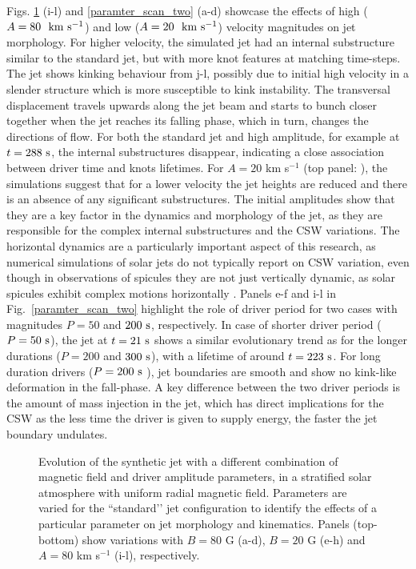 Figs. \ref{paramter_scan_one} (i-l) and \ref{paramter_scan_two} (a-d) showcase the effects of high ($A = 80 ~~\rm{km ~s^{-1}}$) and low ($A = 20 ~~\rm{km ~s^{-1}}$) velocity magnitudes on jet morphology. For higher velocity, the simulated jet had an internal substructure similar to the standard jet, but with more knot features at matching time-steps. The jet shows kinking behaviour from j-l, possibly due to initial high velocity in a slender structure which is more susceptible to kink instability. The transversal displacement travels upwards along the jet beam and starts to bunch closer together when the jet reaches its falling phase, which in turn, changes the directions of flow. For both the standard jet and high amplitude, for example at $t = 288 ~\rm{s}$, the internal substructures disappear, indicating a close association between driver time and knots lifetimes. For $A = 20$ km s$^{-1}$ (top panel: ), the simulations suggest that for a lower velocity the jet heights are reduced and there is an absence of any significant substructures. The initial amplitudes show that they are a key factor in the dynamics and morphology of the jet, as they are responsible for the complex internal substructures and the CSW variations. The horizontal dynamics are a particularly important aspect of this research, as numerical simulations of solar jets do not typically report on CSW variation, even though in observations of spicules they are not just vertically dynamic, as solar spicules exhibit complex motions horizontally \citep{Sharma2018ApJ85361S,Antolin2018ApJ85644A}. \np
%
Panels e-f and i-l in Fig.~\ref{paramter_scan_two} highlight the role of driver period for two cases with magnitudes $P = 50$ and $200~\rm{s}$, respectively. In case of shorter driver period ($P = 50 ~\rm{s}$), the jet at $t = 21~\rm{s}$ shows a similar evolutionary trend as for the longer durations ($P = 200$ and $300~\rm{s}$), with a lifetime of around $t = 223~\rm{s}$. For long duration drivers ($P = 200~\rm{s}$ ), jet boundaries are smooth and show no kink-like deformation in the fall-phase. A key difference between the two driver periods is the amount of mass injection in the jet, which has direct implications for the CSW as the less time the driver is given to supply energy, the faster the jet boundary undulates. \np
\begin{figure}
\captionsetup[subfigure]{labelformat=empty}
\centering
{}
\caption{Evolution of the synthetic jet with a different combination of magnetic field and driver amplitude parameters, in a stratified solar atmosphere with uniform radial magnetic field. Parameters are varied for the ``standard’’ jet configuration to identify the effects of a particular parameter on jet morphology and kinematics. Panels (top-bottom) show variations with $B = 80$ G (a-d), $B = 20$ G  (e-h) and $A = 80$ km s$^{-1}$ (i-l), respectively.}
\label{paramter_scan_one}
\end{figure}
